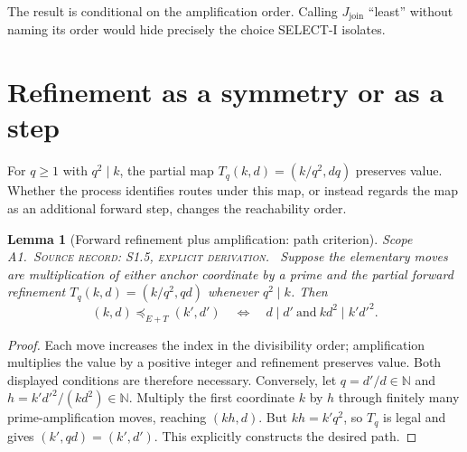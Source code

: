 \documentclass[11pt,oneside,openany]{book}
\newtheorem{lemma}[theorem]{Lemma}
\theoremstyle{definition}
\theoremstyle{remark}
\newcommand{\N}{\mathbb{N}}
\newcommand{\scope}[1]{\textsf{\small Scope #1.}\ }
\newcommand{\record}[1]{\textup{\textsc{Source record: #1.}}\ }
\newcommand{\join}{J_{\mathrm{join}}}
\begin{document}
The result is conditional on the amplification order. Calling \(\join\) ``least'' without naming its order would hide precisely the choice SELECT-I isolates.

\section{Refinement as a symmetry or as a step}
For \(q\ge1\) with \(q^2\mid k\), the partial map \(T_q(k,d)=(k/q^2,dq)\) preserves value. Whether the process identifies routes under this map, or instead regards the map as an additional forward step, changes the reachability order.

\begin{lemma}[Forward refinement plus amplification: path criterion]\label{lem:EA-path}
\scope{A1}\record{S1.5, explicit derivation} Suppose the elementary moves are multiplication of either anchor coordinate by a prime and the partial forward refinement $T_q(k,d)=(k/q^2,qd)$ whenever $q^2\mid k$. Then
\[
 (k,d)\preceq_{E+T}(k',d')\quad\Longleftrightarrow\quad
 d\mid d'\ \text{and}\ kd^2\mid k'd'^2.
\]
\end{lemma}
\begin{proof}
Each move increases the index in the divisibility order; amplification multiplies the value by a positive integer and refinement preserves value. Both displayed conditions are therefore necessary. Conversely, let $q=d'/d\in\N$ and $h=k'd'^2/(kd^2)\in\N$. Multiply the first coordinate $k$ by $h$ through finitely many prime-amplification moves, reaching $(kh,d)$. But $kh=k'q^2$, so $T_q$ is legal and gives $(k',qd)=(k',d')$. This explicitly constructs the desired path.
\end{proof}
\end{document}
